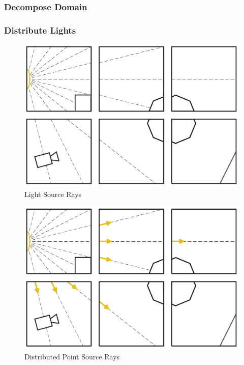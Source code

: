 \documentclass{vgtc}                          %
\begin{document}
\subsubsection{Decompose Domain}
\subsubsection{Distribute Lights}

\begin{figure}[htb]
  \centering
  \includegraphics[width=\columnwidth]{drawings/Lights1.pdf}
  \caption{Light Source Rays}
\end{figure}

\begin{figure}[htb]
  \centering
  \includegraphics[width=\columnwidth]{drawings/Lights2.pdf}
  \caption{Distributed Point Source Rays}
\end{figure}
\end{document}
